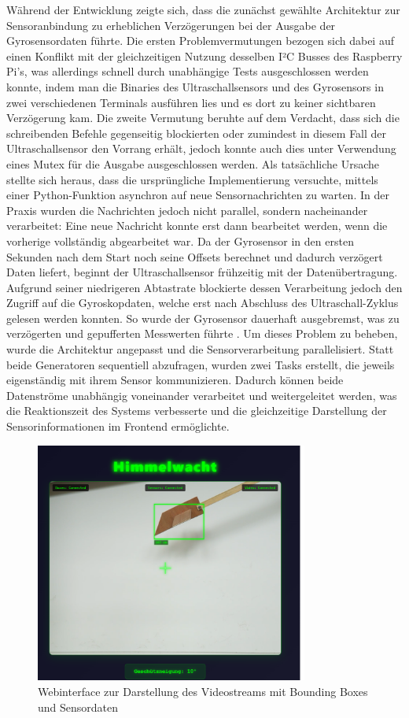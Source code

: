 Während der Entwicklung zeigte sich, dass die zunächst gewählte Architektur zur Sensoranbindung zu erheblichen Verzögerungen bei der Ausgabe der Gyrosensordaten führte. Die ersten Problemvermutungen bezogen sich dabei auf einen Konflikt mit der gleichzeitigen Nutzung desselben I²C Busses des Raspberry Pi's, was allerdings schnell durch unabhängige Tests ausgeschlossen werden konnte, indem man die Binaries des Ultraschallsensors und des Gyrosensors in zwei verschiedenen Terminals ausführen lies und es dort zu keiner sichtbaren Verzögerung kam.
Die zweite Vermutung beruhte auf dem Verdacht, dass sich die schreibenden Befehle gegenseitig blockierten oder zumindest in diesem Fall der Ultraschallsensor den Vorrang erhält, jedoch konnte auch dies unter Verwendung eines Mutex für die Ausgabe ausgeschlossen werden.
Als tatsächliche Ursache stellte sich heraus, dass die ursprüngliche Implementierung versuchte, mittels einer Python-Funktion asynchron auf neue Sensornachrichten zu warten. In der Praxis wurden die Nachrichten jedoch nicht parallel, sondern nacheinander verarbeitet: Eine neue Nachricht konnte erst dann bearbeitet werden, wenn die vorherige vollständig abgearbeitet war. Da der Gyrosensor in den ersten Sekunden nach dem Start noch seine Offsets berechnet und dadurch verzögert Daten liefert, beginnt der Ultraschallsensor frühzeitig mit der Datenübertragung. 
Aufgrund seiner niedrigeren Abtastrate blockierte dessen Verarbeitung jedoch den Zugriff auf die Gyroskopdaten, welche erst nach Abschluss des Ultraschall-Zyklus gelesen werden konnten. So wurde der Gyrosensor dauerhaft ausgebremst, was zu verzögerten und gepufferten Messwerten führte \cite{webserver_python_anext}.
Um dieses Problem zu beheben, wurde die Architektur angepasst und die Sensorverarbeitung parallelisiert. Statt beide Generatoren sequentiell abzufragen, wurden zwei Tasks erstellt, die jeweils eigenständig mit ihrem Sensor kommunizieren. Dadurch können beide Datenströme unabhängig voneinander verarbeitet und weitergeleitet werden, was die Reaktionszeit des Systems verbesserte und die gleichzeitige Darstellung der Sensorinformationen im Frontend ermöglichte.
\begin{figure}[H]
    \begin{center}
        \includegraphics[width=0.8\textwidth]{images/Webserver.png}
        \caption{Webinterface zur Darstellung des Videostreams mit Bounding Boxes und Sensordaten}
        \label{fig:webserver}
    \end{center}
\end{figure}